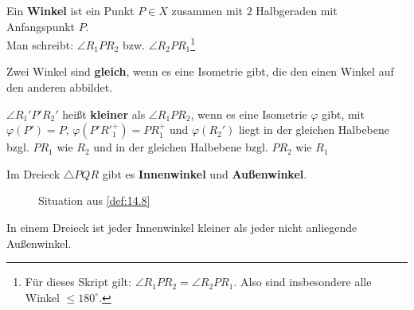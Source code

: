 \begin{definition}\label{def:14.8}%
    \begin{defenum}
        \item \label{def:14.8a} Ein \textbf{Winkel} ist ein Punkt $P \in X$
              zusammen mit $2$ Halbgeraden mit Anfangspunkt $P$.\\
              Man schreibt: $\angle R_1 P R_2$ bzw. $\angle R_2 P R_1$\footnote{Für dieses Skript gilt: $\angle R_1 P R_2 = \angle R_2 P R_1$. Also sind insbesondere alle Winkel $ \leq 180^\circ$.}
        \item Zwei Winkel sind \textbf{gleich}, wenn es eine Isometrie gibt,
              die den einen Winkel auf den anderen abbildet.
        \item \label{def:14.8c} $\angle R_1' P' R_2'$ heißt \textbf{kleiner} als
              $\angle R_1 P R_2$, wenn es eine Isometrie $\varphi$
              gibt, mit $\varphi(P') = P$, $\varphi(P'R'^{+}_{1}) = PR_{1}^{+}$
              und $\varphi(R_2')$ liegt in der gleichen Halbebene
              bzgl. $PR_1$ wie $R_2$ und in der gleichen Halbebene
              bzgl. $PR_2$ wie $R_1$
        \item \label{def:14.8d} Im Dreieck $\triangle PQR$ gibt es \textbf{Innenwinkel} und
              \textbf{Außenwinkel}.
    \end{defenum}
\end{definition}

\begin{figure}[ht]
    \centering
    \label{fig:def.14.8.0}
    \caption{Situation aus \cref{def:14.8}}
\end{figure}

\begin{bemerkung}\label{bem:14.9}%
    In einem Dreieck ist jeder Innenwinkel kleiner als jeder nicht
    anliegende Außenwinkel.
\end{bemerkung}

